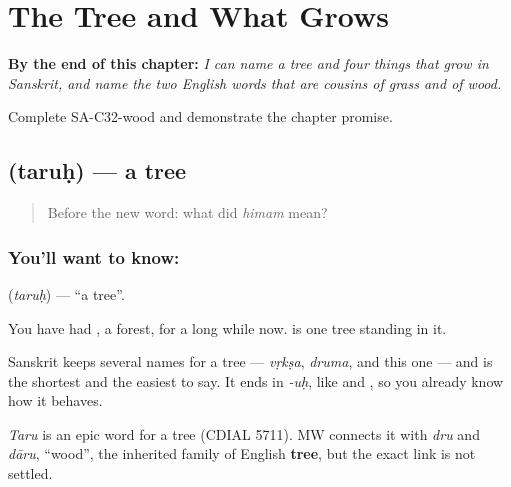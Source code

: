 
\chapter{The Tree and What Grows}
\label{ch:sa-tree}

\begin{chapteropening}
\textbf{By the end of this chapter:} \emph{I can name a tree and four things that grow in Sanskrit, and name the two English words that are cousins of grass and of wood.}

Complete SA-C32-wood and demonstrate the chapter promise.
\end{chapteropening}

\section[\texorpdfstring{\sk{तरुः} (taruḥ)}{तरुः (taruḥ)}]{ (taruḥ) — a tree}

\label{lesson:SA-C32-tree}



\begin{quote}
Before the new word: what did \emph{himam} mean?
\end{quote}

\subsection*{You'll want to know: }
\textbf{} (\emph{taruḥ}) — \textquotedblleft{}a tree\textquotedblright{}.

You have had \textbf{}, a forest, for a long while now. \textbf{} is one tree standing in it.

Sanskrit keeps several names for a tree — \emph{vṛkṣa}, \emph{druma}, and this one — and \textbf{} is the shortest and the easiest to say. It ends in \emph{-uḥ}, like \textbf{} and \textbf{}, so you already know how it behaves.

\begin{cousinweb}
\emph{Taru} is an epic word for a tree (CDIAL 5711). MW connects it with \emph{dru} and \emph{dāru}, \textquotedblleft{}wood\textquotedblright{}, the inherited family of English \textbf{tree}, but the exact link is not settled.
\end{cousinweb}

